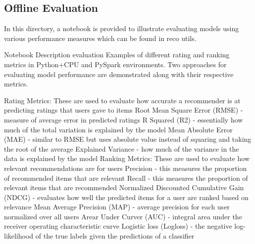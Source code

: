 \subsection{Offline Evaluation}

In this directory, a notebook is provided to illustrate evaluating models using various performance measures which can be found in reco utils.

Notebook	Description
evaluation	Examples of different rating and ranking metrics in Python+CPU and PySpark environments.
Two approaches for evaluating model performance are demonstrated along with their respective metrics.

Rating Metrics: These are used to evaluate how accurate a recommender is at predicting ratings that users gave to items
Root Mean Square Error (RMSE) - measure of average error in predicted ratings
R Squared (R2) - essentially how much of the total variation is explained by the model
Mean Absolute Error (MAE) - similar to RMSE but uses absolute value instead of squaring and taking the root of the average
Explained Variance - how much of the variance in the data is explained by the model
Ranking Metrics: These are used to evaluate how relevant recommendations are for users
Precision - this measures the proportion of recommended items that are relevant
Recall - this measures the proportion of relevant items that are recommended
Normalized Discounted Cumulative Gain (NDCG) - evaluates how well the predicted items for a user are ranked based on relevance
Mean Average Precision (MAP) - average precision for each user normalized over all users
Arear Under Curver (AUC) - integral area under the receiver operating characteristic curve
Logistic loss (Logloss) - the negative log-likelihood of the true labels given the predictions of a classifier

